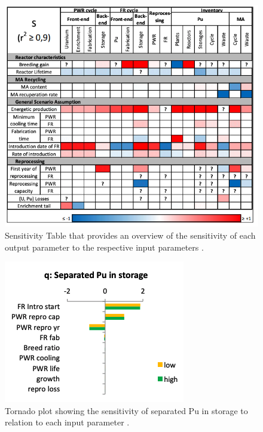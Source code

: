 \begin{figure}[]
	\begin{center}
		\includegraphics[scale=0.55]{./figures/oecd-sensitivitytable.png}
	\end{center}	
		\caption{Sensitivity Table that provides an overview of the sensitivity 
		of each output parameter to the respective input parameters \cite{noauthor_effects_2017}.}
	\label{fig:oecd-sensitivitytable}
\end{figure}

\begin{figure}[]
	\begin{center}
		\includegraphics[scale=0.65]{./figures/oecd-tornado.png}
	\end{center}	
		\caption{Tornado plot showing the sensitivity of separated Pu in 
		storage to relation to each input parameter \cite{noauthor_effects_2017}.}
	\label{fig:oecd-tornado}
\end{figure}

